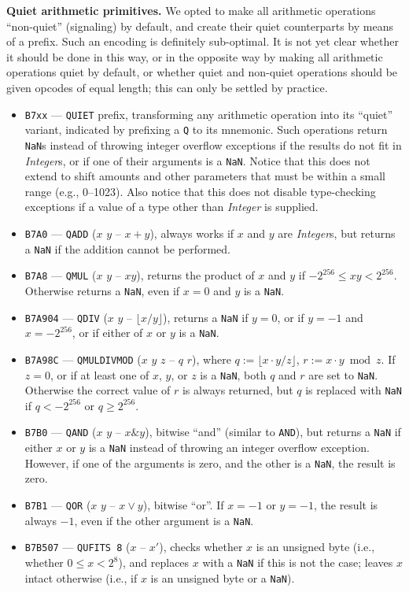 \documentclass[12pt,oneside]{article}
\def\makepoint#1{\medbreak\noindent{\bf #1.\ }}
\def\nxsubpoint{\refstepcounter{subsubsection}%
  \smallbreak\makepoint{\thesubsubsection}}
\def\emb#1{\textbf{#1.}}
\begin{document}
\nxsubpoint\emb{Quiet arithmetic primitives}
We opted to make all arithmetic operations ``non-quiet'' (signaling) by default, and create their quiet counterparts by means of a prefix. Such an encoding is definitely sub-optimal. It is not yet clear whether it should be done in this way, or in the opposite way by making all arithmetic operations quiet by default, or whether quiet and non-quiet operations should be given opcodes of equal length; this can only be settled by practice.
\begin{itemize}
\item {\tt B7xx} --- {\tt QUIET} prefix, transforming any arithmetic operation into its ``quiet'' variant, indicated by prefixing a {\tt Q} to its mnemonic. Such operations return {\tt NaN}s instead of throwing integer overflow exceptions if the results do not fit in {\it Integer\/}s, or if one of their arguments is a {\tt NaN}. Notice that this does not extend to shift amounts and other parameters that must be within a small range (e.g., 0--1023). Also notice that this does not disable type-checking exceptions if a value of a type other than {\it Integer\/} is supplied. 
\item {\tt B7A0} --- {\tt QADD} ($x$ $y$ -- $x+y$), always works if $x$ and $y$ are {\it Integer\/}s, but returns a {\tt NaN} if the addition cannot be performed.
\item {\tt B7A8} --- {\tt QMUL} ($x$ $y$ -- $xy$), returns the product of $x$ and $y$ if $-2^{256}\leq xy<2^{256}$. Otherwise returns a {\tt NaN}, even if $x=0$ and $y$ is a {\tt NaN}.
\item {\tt B7A904} --- {\tt QDIV} ($x$ $y$ -- $\lfloor x/y\rfloor$), returns a {\tt NaN} if $y=0$, or if $y=-1$ and $x=-2^{256}$, or if either of $x$ or $y$ is a {\tt NaN}.
\item {\tt B7A98C} --- {\tt QMULDIVMOD} ($x$ $y$ $z$ -- $q$ $r$), where $q:=\lfloor x\cdot y/z\rfloor$, $r:=x\cdot y\bmod z$. If $z=0$, or if at least one of $x$, $y$, or $z$ is a {\tt NaN}, both $q$ and $r$ are set to {\tt NaN}. Otherwise the correct value of $r$ is always returned, but $q$ is replaced with {\tt NaN} if $q<-2^{256}$ or $q\geq2^{256}$.
\item {\tt B7B0} --- {\tt QAND} ($x$ $y$ -- $x\&y$), bitwise ``and'' (similar to {\tt AND}), but returns a {\tt NaN} if either $x$ or $y$ is a {\tt NaN} instead of throwing an integer overflow exception. However, if one of the arguments is zero, and the other is a {\tt NaN}, the result is zero.
\item {\tt B7B1} --- {\tt QOR} ($x$ $y$ -- $x\vee y$), bitwise ``or''. If $x=-1$ or $y=-1$, the result is always $-1$, even if the other argument is a {\tt NaN}.
\item {\tt B7B507} --- {\tt QUFITS 8} ($x$ -- $x'$), checks whether $x$ is an unsigned byte (i.e., whether $0\leq x<2^8$), and replaces $x$ with a {\tt NaN} if this is not the case; leaves $x$ intact otherwise (i.e., if $x$ is an unsigned byte or a {\tt NaN}).
\end{itemize}
\end{document}
